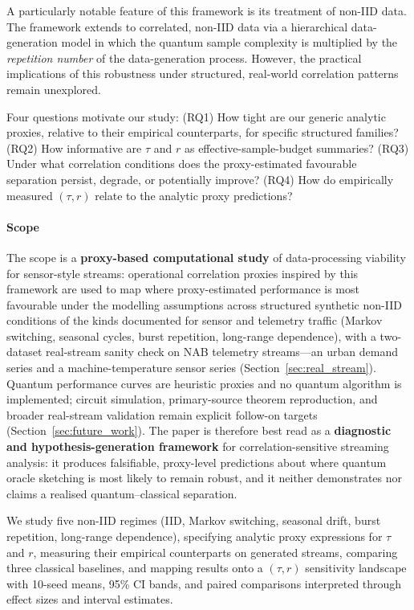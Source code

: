 \documentclass[sensors,article,submit,pdftex,moreauthors]{Definitions/mdpi}
\begin{document}
A particularly notable feature of this framework is its treatment of non\nobreakdash-IID data. The framework extends to correlated, non\nobreakdash-IID data via a hierarchical data-generation model in which the quantum sample complexity is multiplied by the \emph{repetition number} of the data-generation process. However, the practical implications of this robustness under structured, real-world correlation patterns remain unexplored.

Four questions motivate our study: (RQ1) How tight are our generic analytic proxies, relative to their empirical counterparts, for specific structured families? (RQ2) How informative are $\tau$ and $r$ as effective-sample-budget summaries? (RQ3) Under what correlation conditions does the proxy-estimated favourable separation persist, degrade, or potentially improve? (RQ4) How do empirically measured $(\tau, r)$ relate to the analytic proxy predictions?

\paragraph{Scope} The scope is a \textbf{proxy-based computational study} of data-processing viability for sensor-style streams: operational correlation proxies inspired by this framework are used to map where proxy-estimated performance is most favourable under the modelling assumptions across structured synthetic non\nobreakdash-IID conditions of the kinds documented for sensor and telemetry traffic (Markov switching, seasonal cycles, burst repetition, long-range dependence), with a two\nobreakdash-dataset real-stream sanity check on NAB telemetry streams---an urban demand series and a machine-temperature sensor series (Section~\ref{sec:real_stream}). Quantum performance curves are heuristic proxies and no quantum algorithm is implemented; circuit simulation, primary-source theorem reproduction, and broader real-stream validation remain explicit follow-on targets (Section~\ref{sec:future_work}). The paper is therefore best read as a \textbf{diagnostic and hypothesis-generation framework} for correlation-sensitive streaming analysis: it produces falsifiable, proxy-level predictions about where quantum oracle sketching is most likely to remain robust, and it neither demonstrates nor claims a realised quantum--classical separation.

We study five non\nobreakdash-IID regimes (IID, Markov switching, seasonal drift, burst repetition, long-range dependence), specifying analytic proxy expressions for $\tau$ and $r$, measuring their empirical counterparts on generated streams, comparing three classical baselines, and mapping results onto a $(\tau, r)$ sensitivity landscape with 10-seed means, 95\% CI bands, and paired comparisons interpreted through effect sizes and interval estimates.
\end{document}
